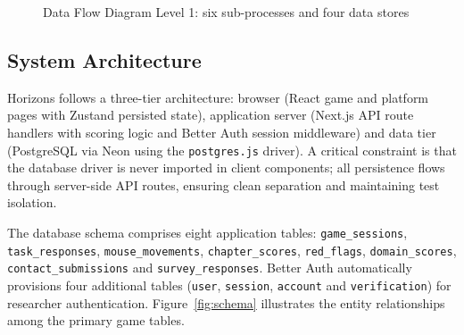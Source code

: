 \documentclass[12pt,a4paper,oneside]{report}
\begin{document}
\begin{figure}[b]
{}
  \caption{Data Flow Diagram Level 1: six sub-processes and four data stores}
  \label{fig:dfd1}
\end{figure}

\clearpage
\subsection{System Architecture}

Horizons follows a three-tier architecture: browser (React game and platform pages with Zustand persisted state), application server (Next.js API route handlers with scoring logic and Better Auth session middleware) and data tier (PostgreSQL via Neon using the \texttt{postgres.js} driver). A critical constraint is that the database driver is never imported in client components; all persistence flows through server-side API routes, ensuring clean separation and maintaining test isolation.

\begin{sloppypar}
The database schema comprises eight application tables:
\texttt{game\_sessions}, \texttt{task\_responses}, \texttt{mouse\_movements},
\texttt{chapter\_scores}, \texttt{red\_flags}, \texttt{domain\_scores},
\texttt{contact\_submissions} and \texttt{survey\_responses}.
Better Auth automatically provisions four additional tables (\texttt{user}, \texttt{session}, \texttt{account} and \texttt{verification}) for researcher authentication.
Figure~\ref{fig:schema} illustrates the entity relationships among the primary game tables.
\end{sloppypar}
\end{document}
